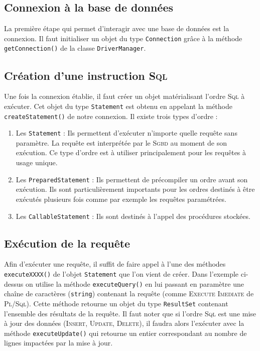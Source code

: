\documentclass{article}
\begin{document}
\subsection{Connexion à la base de données}
La première étape qui permet d'interagir avec une base de données est la connexion. Il faut initialiser un objet du type \texttt{Connection} grâce à la méthode \texttt{getConnection()} de la classe \texttt{DriverManager}.
\subsection{Création d'une instruction \textsc{Sql}}
Une fois la connexion établie, il faut créer un objet matérialisant l'ordre \textsc{Sql} à exécuter. Cet objet du type \texttt{Statement} est obtenu en appelant la méthode \texttt{createStatement()} de notre connexion. Il existe trois types d'ordre :

\begin{enumerate}
\item Les \texttt{Statement} : Ils permettent d'exécuter n'importe quelle requête sans paramètre. La requête est interprétée par le \textsc{Sgbd} au moment de son exécution. Ce type d'ordre est à utiliser principalement pour les requêtes à usage unique.

\item Les \texttt{PreparedStatement} : Ils permettent de précompiler un ordre avant son exécution. Ils sont particulièrement importants pour les ordres destinés à être exécutés plusieurs fois comme par exemple les requêtes paramétrées.

\item Les \texttt{CallableStatement} : Ils sont destinés à l'appel des procédures stockées.

\end{enumerate}

\subsection{Exécution de la requête}
Afin d'exécuter une requête, il suffit de faire appel à l'une des méthodes \texttt{executeXXXX()} de l'objet \texttt{Statement} que l'on vient de créer. Dans l'exemple ci-dessus on utilise la méthode \texttt{executeQuery()} en lui passant en paramètre une chaîne de caractères (\texttt{string}) contenant la requête (comme \textsc{Execute Imediate} de \textsc{Pl/Sql}). Cette méthode retourne un objet du type \texttt{ResultSet} contenant l'ensemble des résultats de la requête. Il faut noter que si l'ordre \textsc{Sql} est une mise à jour des données (\textsc{Insert}, \textsc{Update}, \textsc{Delete}), il faudra alors l'exécuter avec la méthode \texttt{executeUpdate()} qui retourne un entier correspondant au nombre de lignes impactées par la mise à jour.
\end{document}
